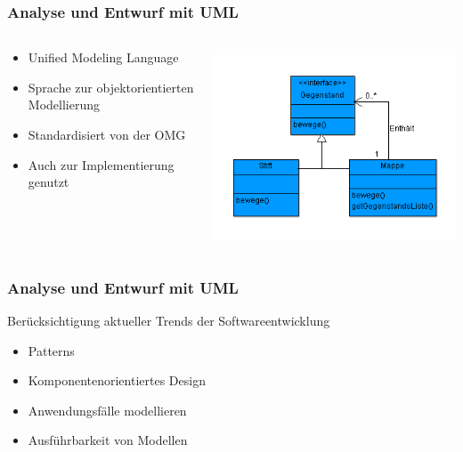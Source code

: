 \begin{frame}
\frametitle{Analyse und Entwurf mit UML}
	\begin{columns}
			\begin{column}{.5\textwidth}
			\small
			\begin{itemize}
				\item Unified Modeling Language
				\item Sprache zur objektorientierten Modellierung
				\item Standardisiert von der OMG
				\item Auch zur Implementierung genutzt
			\end{itemize}
			\normalsize
			\end{column}
			\begin{column}{.5\textwidth}
				\center
				\includegraphics[width=1\textwidth,
				keepaspectratio=true]{bilder/uml_example.png}
			\end{column}
	\end{columns}
\end{frame}

\begin{frame}
\frametitle{Analyse und Entwurf mit UML}
		Berücksichtigung aktueller Trends der Softwareentwicklung
		\begin{itemize}
			\item Patterns
			\item Komponentenorientiertes Design
			\item Anwendungsfälle modellieren
			\item Ausführbarkeit von Modellen
		\end{itemize}
\end{frame}


